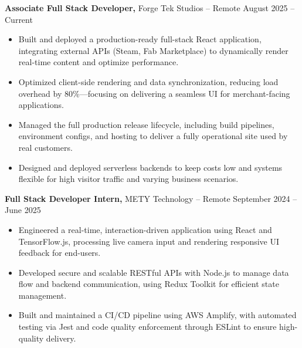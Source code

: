 \documentclass[11pt]{article}       %
\begin{document}
\textbf{Associate Full Stack Developer,} {Forge Tek Studios} -- Remote \hfill August 2025 -- Current 
\vspace{-9pt}
\begin{itemize}
  \item Built and deployed a production-ready full-stack React application, integrating external APIs (Steam, Fab Marketplace) to dynamically render real-time content and optimize performance.
  \item Optimized client-side rendering and data synchronization, reducing load overhead by 80\%—focusing on delivering a seamless UI for merchant-facing applications.
  \item Managed the full production release lifecycle, including build pipelines, environment configs, and hosting to deliver a fully operational site used by real customers.
  \item Designed and deployed serverless backends to keep costs low and systems flexible for high visitor traffic and varying business scenarios.
\end{itemize}

\textbf{Full Stack Developer Intern,} {METY Technology} -- Remote \hfill September 2024 -- June 2025 
\vspace{-9pt}
\begin{itemize}
  \item Engineered a real-time, interaction-driven application using React and TensorFlow.js, processing live camera input and rendering responsive UI feedback for end-users.
  \item Developed secure and scalable RESTful APIs with Node.js to manage data flow and backend communication, using Redux Toolkit for efficient state management.
  \item Built and maintained a CI/CD pipeline using AWS Amplify, with automated testing via Jest and code quality enforcement through ESLint to ensure high-quality delivery.
\end{itemize}

\end{document}
